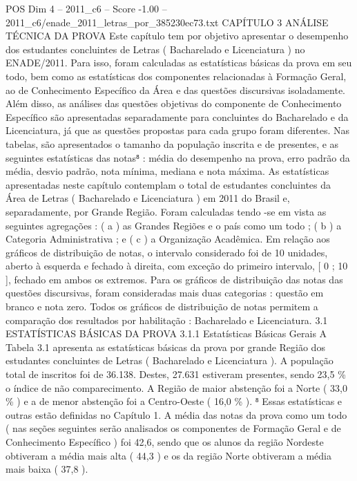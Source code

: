 \begin{textsample}{POS Dim 4 – 2011\_c6 – Score -1.00 – 2011\_c6/enade\_2011\_letras\_por\_385230ec73.txt}  \label{ex:f4_pos_305}
CAPÍTULO 3 ANÁLISE TÉCNICA DA PROVA Este capítulo tem por objetivo apresentar o desempenho dos estudantes concluintes de Letras ( Bacharelado e Licenciatura ) no ENADE/2011.
Para isso, foram calculadas as estatísticas básicas da prova em seu todo, bem como as estatísticas dos componentes relacionadas à Formação Geral, ao de Conhecimento Específico da Área e das questões discursivas isoladamente.
Além disso, as análises das questões objetivas do componente de Conhecimento Específico são apresentadas separadamente para concluintes do Bacharelado e da Licenciatura, já que as questões propostas para cada grupo foram diferentes.
Nas tabelas, são apresentados o tamanho da população inscrita e de presentes, e as seguintes estatísticas das notas⁸ : média do desempenho na prova, erro padrão da média, desvio padrão, nota mínima, mediana e nota máxima.
As estatísticas apresentadas neste capítulo contemplam o total de estudantes concluintes da Área de Letras ( Bacharelado e Licenciatura ) em 2011 do Brasil e, separadamente, por Grande Região.
Foram calculadas tendo -se em vista as seguintes agregações : ( a ) as Grandes Regiões e o país como um todo ; ( b ) a Categoria Administrativa ; e ( c ) a Organização Acadêmica.
Em relação aos gráficos de distribuição de notas, o intervalo considerado foi de 10 unidades, aberto à esquerda e fechado à direita, com exceção do primeiro intervalo, [ 0 ; 10 ], fechado em ambos os extremos.
Para os gráficos de distribuição das notas das questões discursivas, foram consideradas mais duas categorias : questão em branco e nota zero.
Todos os gráficos de distribuição de notas permitem a comparação dos resultados por habilitação : Bacharelado e Licenciatura. 3.1 ESTATÍSTICAS BÁSICAS DA PROVA 3.1.1 Estatísticas Básicas Gerais A Tabela 3.1 apresenta as estatísticas básicas da prova por grande Região dos estudantes concluintes de Letras ( Bacharelado e Licenciatura ).
A população total de inscritos foi de 36.138.
Destes, 27.631 estiveram presentes, sendo 23,5 \% o índice de não comparecimento.
A Região de maior abstenção foi a Norte ( 33,0 \% ) e a de menor abstenção foi a Centro-Oeste ( 16,0 \% ). ⁸ Essas estatísticas e outras estão definidas no Capítulo 1.
A média das notas da prova como um todo ( nas seções seguintes serão analisados os componentes de Formação Geral e de Conhecimento Específico ) foi 42,6, sendo que os alunos da região Nordeste obtiveram a média mais alta ( 44,3 ) e os da região Norte obtiveram a média mais baixa ( 37,8 ).

\end{textsample}
